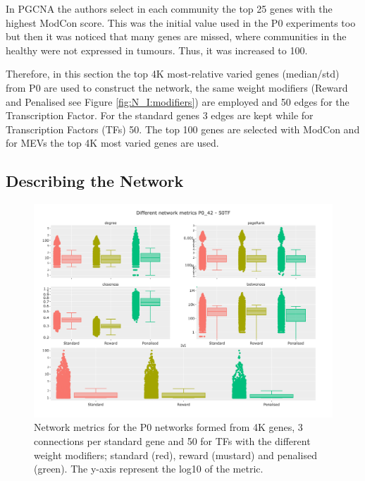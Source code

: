 In PGCNA \citet{Care2019-ij} the authors select in each community the top 25 genes with the highest ModCon score. This was the initial value used in the P0 experiments too but then it was noticed that many genes are missed, where communities in the healthy were not expressed in tumours. Thus, it was increased to 100.

Therefore, in this section the top 4K most-relative varied genes (median/std) from P0 are used to construct the network, the same weight modifiers (Reward and Penalised see Figure \ref{fig:N_I:modifiers}) are employed and 50 edges for the Transcription Factor. For the standard genes 3 edges are kept while for Transcription Factors (TFs) 50. The top 100 genes are selected with ModCon and for MEVs the top 4K most varied genes are used.

\subsection{Describing the Network}


\begin{figure}[!htb]    
    \centering
    \includegraphics[width=1.0\textwidth,height=0.7\textheight,keepaspectratio]{Sections/Network_I/Resources/P0/P0_NetworkMetricsComp_50TF_2.png}
    \caption{Network metrics for the P0 networks formed from 4K genes, 3 connections per standard gene and 50 for TFs with the different weight modifiers; standard (red), reward (mustard) and penalised (green). The y-axis represent the log10 of the metric. }
    \label{fig:N_I:net_metrics_p0}
\end{figure}

